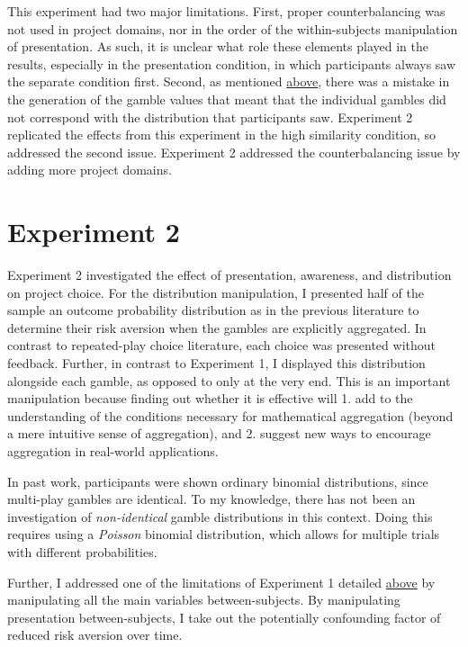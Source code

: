 \documentclass[a4paper, nobind, dvipsnames]{templates/ociamthesis}
\theoremstyle{definition}
\theoremstyle{definition}
\theoremstyle{definition}
\theoremstyle{definition}
\theoremstyle{remark}
\begin{document}
This experiment had two major limitations. First, proper counterbalancing was
not used in project domains, nor in the order of the within-subjects
manipulation of presentation. As such, it is unclear what role these elements
played in the results, especially in the presentation condition, in which
participants always saw the separate condition first. Second, as mentioned
\protect\hyperlink{outcome-distribution-materials-aggregation-1}{above}, there was a mistake in the
generation of the gamble values that meant that the individual gambles did not
correspond with the distribution that participants saw. Experiment 2 replicated
the effects from this experiment in the high similarity condition, so addressed
the second issue. Experiment 2 addressed the counterbalancing issue by adding
more project domains.

\hypertarget{experiment-2}{%
\section{Experiment 2}\label{experiment-2}}

Experiment 2 investigated the effect of presentation, awareness, and
distribution on project choice. For the distribution manipulation, I presented
half of the sample an outcome probability distribution as in the previous
literature \autocites[e.g.,][]{redelmeier1992,webb2017} to determine their risk aversion
when the gambles are explicitly aggregated. In contrast to repeated-play choice
literature, each choice was presented without feedback. Further, in contrast to
Experiment 1, I displayed this distribution alongside each gamble, as opposed to
only at the very end. This is an important manipulation because finding out
whether it is effective will 1. add to the understanding of the conditions
necessary for mathematical aggregation (beyond a mere intuitive sense of
aggregation), and 2. suggest new ways to encourage aggregation in real-world
applications.

In past work, participants were shown ordinary binomial distributions, since
multi-play gambles are identical. To my knowledge, there has not been an
investigation of \emph{non-identical} gamble distributions in this context. Doing
this requires using a \emph{Poisson} binomial distribution, which allows for multiple
trials with different probabilities.

Further, I addressed one of the limitations of Experiment 1 detailed
\protect\hyperlink{discussion-aggregation-1}{above} by manipulating all the main variables
between-subjects. By manipulating presentation between-subjects, I take out the
potentially confounding factor of reduced risk aversion over time.
\end{document}
